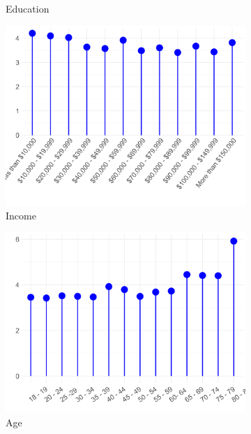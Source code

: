 \documentclass[12pt]{article}
\begin{document}
\begin{figure}[ht!]
\begin{subfigure}[b]{0.3\textwidth}
            \caption{Education}
            \label{fig:grd-int-edu}
    \end{subfigure}
     \begin{subfigure}[b]{0.3\textwidth}
        \includegraphics[width=1.0\textwidth]{Plots/uni-dist-grd-int-inc.png}
            \caption{Income}
            \label{fig:grd-int-inc}
    \end{subfigure}
     \begin{subfigure}[b]{0.3\textwidth}
        \includegraphics[width=1.0\textwidth]{Plots/uni-dist-grd-int-age.png}
            \caption{Age}
            \label{fig:grd-int-age}
    \end{subfigure}
     \begin{subfigure}[b]{0.3\textwidth}

\end{subfigure}
\end{figure}
\end{document}
